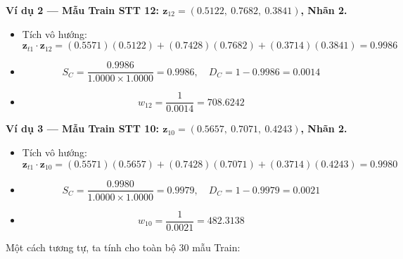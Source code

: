 \documentclass[12pt,a4paper]{article}
\begin{document}
\textbf{Ví dụ 2 — Mẫu Train STT 12: $\mathbf{z}_{12} = (0.5122,\ 0.7682,\ 0.3841)$, Nhãn 2.}
\begin{itemize}
    \item Tích vô hướng:
    \[
        \mathbf{z}_{t1} \cdot \mathbf{z}_{12}
        = (0.5571)(0.5122) + (0.7428)(0.7682) + (0.3714)(0.3841) = 0.9986
    \]
    \item
    \[
        S_C = \frac{0.9986}{1.0000 \times 1.0000} = 0.9986, \quad
        D_C = 1 - 0.9986 = 0.0014
    \]
    \item
    \[
        w_{12} = \frac{1}{0.0014} = 708.6242
    \]
\end{itemize}
 
\textbf{Ví dụ 3 — Mẫu Train STT 10: $\mathbf{z}_{10} = (0.5657,\ 0.7071,\ 0.4243)$, Nhãn 2.}
\begin{itemize}
    \item Tích vô hướng:
    \[
        \mathbf{z}_{t1} \cdot \mathbf{z}_{10}
        = (0.5571)(0.5657) + (0.7428)(0.7071) + (0.3714)(0.4243) = 0.9980
    \]
    \item
    \[
        S_C = \frac{0.9980}{1.0000 \times 1.0000} = 0.9979, \quad
        D_C = 1 - 0.9979 = 0.0021
    \]
    \item
    \[
        w_{10} = \frac{1}{0.0021} = 482.3138
    \]
\end{itemize}
 
Một cách tương tự, ta tính cho toàn bộ 30 mẫu Train:
 
\end{document}
